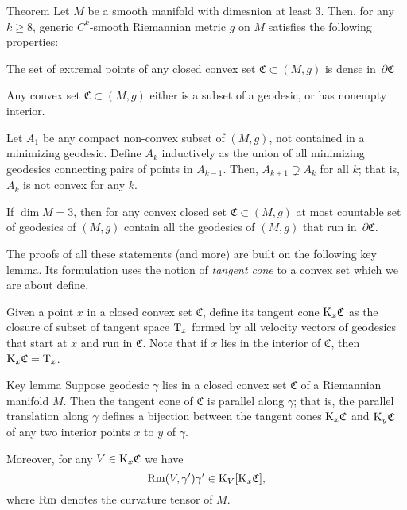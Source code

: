 \documentclass[a4paper,10pt]{article}
\begin{document}
\begin{thm}{Theorem}
Let $M$ be a smooth manifold with dimesnion at least 3.
Then, for any $k\ge 8$, generic $C^k$-smooth Riemannian metric $g$ on $M$ satisfies the following properties:

\begin{subthm}{}
The set of extremal points of any closed convex set $\mathfrak{C}\subset (M,g)$ is dense in~$\partial\mathfrak{C}$
\end{subthm}

\begin{subthm}{}
Any convex set $\mathfrak{C}\subset (M,g)$ either is a subset of a geodesic, or has nonempty interior.
\end{subthm}


\begin{subthm}{}
Let $A_1$ be any compact non-convex  subset of $(M,g)$, not contained in a minimizing  geodesic. Define  $A_k$ inductively as  the union of all minimizing geodesics connecting pairs of  points in 
$A_{k-1}$.
Then, $A_{k+1}\supsetneq A_k$ for all $k$;
that is, $A_k$ is not convex for any $k$.
\end{subthm}


\begin{subthm}{}
If $\dim M=3$, then for any convex closed set $\mathfrak{C}\subset (M,g)$ at most countable set of geodesics of $(M,g)$ contain all the geodesics of $(M,g)$ that run in~$\partial\mathfrak{C}$.
\end{subthm}
\end{thm}

The proofs of all these statements (and more) are built on the following key lemma.
Its formulation uses the notion of \emph{tangent cone} to a convex set which we are about define.

Given a point $x$ in a closed convex set $\mathfrak{C}$, define its tangent cone $\mathrm{K}_x\mathfrak{C}$ as the closure of subset of tangent space $\mathrm{T}_x$ formed by all velocity vectors of geodesics that start at $x$ and run in $\mathfrak{C}$.
Note that if $x$ lies in the interior of $\mathfrak{C}$, then $\mathrm{K}_x\mathfrak{C}=\mathrm{T}_x$.
 
\begin{thm}{Key lemma}
Suppose geodesic $\gamma$ lies in a closed convex set $\mathfrak{C}$ of a Riemannian manifold $M$.
Then the tangent cone of $\mathfrak{C}$ is parallel along $\gamma$; that is, the parallel translation along $\gamma$ defines a bijection between the tangent cones $\mathrm{K}_x\mathfrak{C}$ and $\mathrm{K}_y\mathfrak{C}$ of any two interior points $x$ to $y$ of $\gamma$.

Moreover, for any $V\in \mathrm{K}_x\mathfrak{C}$ we have
\[\operatorname{Rm}(V,\gamma')\gamma'\in \mathrm{K}_V[\mathrm{K}_x\mathfrak{C}],\]
where $\operatorname{Rm}$ denotes the curvature tensor of $M$.
\end{thm}
  
\end{document}

